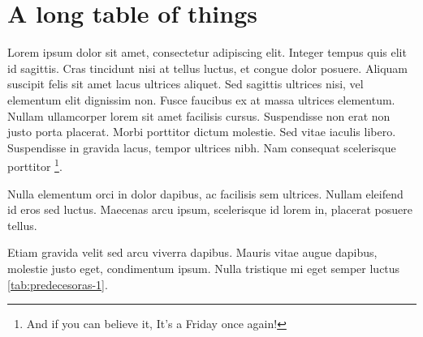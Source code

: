 % 
% 
% 






\chapter{A long table of things}

Lorem ipsum dolor sit amet, consectetur adipiscing elit. Integer tempus quis elit id sagittis. Cras tincidunt nisi at tellus luctus, et congue dolor posuere. Aliquam suscipit felis sit amet lacus ultrices aliquet. Sed sagittis ultrices nisi, vel elementum elit dignissim non. Fusce faucibus ex at massa ultrices elementum. Nullam ullamcorper lorem sit amet facilisis cursus. Suspendisse non erat non justo porta placerat. Morbi porttitor dictum molestie. Sed vitae iaculis libero. Suspendisse in gravida lacus, tempor ultrices nibh. Nam consequat scelerisque porttitor \footnote{And if you can believe it, It's a Friday once again!}.

Nulla elementum orci in dolor dapibus, ac facilisis sem ultrices. Nullam eleifend id eros sed luctus. Maecenas arcu ipsum, scelerisque id lorem in, placerat posuere tellus. 

Etiam gravida velit sed arcu viverra dapibus. Mauris vitae augue dapibus, molestie justo eget, condimentum ipsum. Nulla tristique mi eget semper luctus \autoref{tab:predecesoras-1}. 


